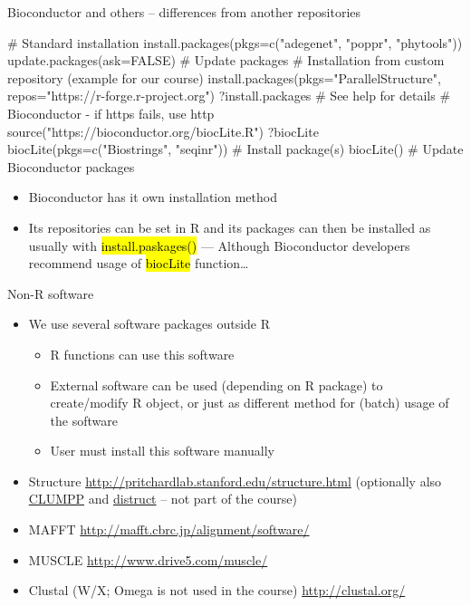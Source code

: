 \documentclass[compress, ucs, xelatex, 11pt, xcolor=svgnames,
  hyperref={
    bookmarks=true,
    unicode=true,
    colorlinks=true,
    pdftitle={Molecular data in R},
    plainpages=false,
    pdfauthor={Vojtech Zeisek},
    pdfsubject={Course about phylogeny and evolution in R},
    pdfcreator={XeLaTeX},
    pdfkeywords={R, evolution, phylogeny, molecular data},
    linkcolor=Tomato,
    anchorcolor=SaddleBrown,
    citecolor=Goldenrod,
    filecolor=DarkMagenta,
    menucolor=Sienna,
    urlcolor=DarkTurquoise,
    pdftex},
  url={hyphens, lowtilde} %
  ]{beamer}
\renewcommand{\texttt}[1]{\hl{\ttfamily #1}}
\begin{document}
\begin{frame}[fragile]{Bioconductor and others -- differences from another repositories}
  \begin{spluscode}
    # Standard installation
    install.packages(pkgs=c("adegenet", "poppr", "phytools"))
    update.packages(ask=FALSE) # Update packages
    # Installation from custom repository (example for our course)
    install.packages(pkgs="ParallelStructure",
      repos="https://r-forge.r-project.org")
    ?install.packages # See help for details
    # Bioconductor - if https fails, use http
    source("https://bioconductor.org/biocLite.R")
    ?biocLite
    biocLite(pkgs=c("Biostrings", "seqinr")) # Install package(s)
    biocLite() # Update Bioconductor packages
  \end{spluscode}
  \begin{itemize}
    \item Bioconductor has it own installation method
    \item Its repositories can be set in R and its packages can then be installed as usually with \texttt{install.paskages()} --- Although Bioconductor developers recommend usage of \texttt{biocLite} function\ldots
  \end{itemize}
\end{frame}

\begin{frame}{Non-R software}
  \begin{itemize}
    \item We use several software packages outside R
    \begin{itemize}
      \item R functions can use this software
      \item External software can be used (depending on R package) to create/modify R object, or just as different method for (batch) usage of the software
      \item User must install this software manually
    \end{itemize}
    \item Structure \url{http://pritchardlab.stanford.edu/structure.html} (optionally also \href{https://web.stanford.edu/group/rosenberglab/clumpp.html}{CLUMPP} and \href{https://web.stanford.edu/group/rosenberglab/distruct.html}{distruct} -- not part of the course)
    \item MAFFT \url{http://mafft.cbrc.jp/alignment/software/}
    \item MUSCLE \url{http://www.drive5.com/muscle/}
    \item Clustal (W/X; Omega is not used in the course) \url{http://clustal.org/}
  \end{itemize}
\end{frame}
\end{document}
